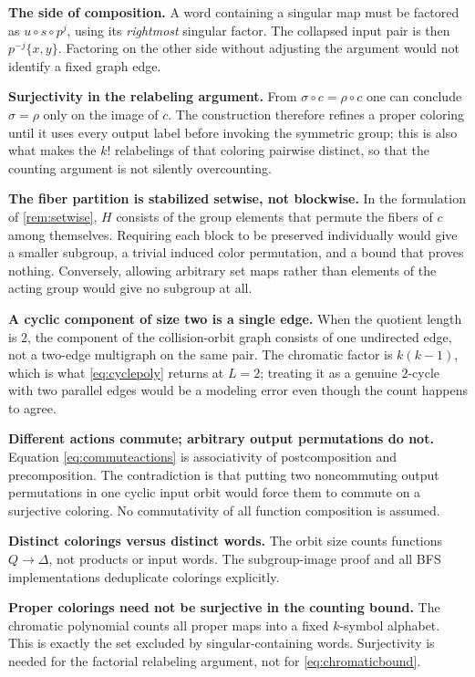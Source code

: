 \documentclass[11pt,a4paper]{article}
\numberwithin{equation}{section}
\theoremstyle{definition}
\theoremstyle{remark}
\newcommand{\D}{\Delta}
\begin{document}
\textbf{The side of composition.} A word containing a singular map must be
factored as $u\circ s\circ p^j$, using its \emph{rightmost} singular factor.
The collapsed input pair is then $p^{-j}\{x,y\}$. Factoring on the other
side without adjusting the argument would not identify a fixed graph edge.

\textbf{Surjectivity in the relabeling argument.} From
$\sigma\circ c=\rho\circ c$ one can conclude $\sigma=\rho$ only on the
image of $c$. The construction therefore refines a proper coloring until it
uses every output label before invoking the symmetric group; this is also
what makes the $k!$ relabelings of that coloring pairwise distinct, so that
the counting argument is not silently overcounting.

\textbf{The fiber partition is stabilized setwise, not blockwise.} In the
formulation of \cref{rem:setwise}, $H$ consists of the group elements that
permute the fibers of $c$ among themselves. Requiring each block to be
preserved individually would give a smaller subgroup, a trivial induced
color permutation, and a bound that proves nothing. Conversely, allowing
arbitrary set maps rather than elements of the acting group would give no
subgroup at all.

\textbf{A cyclic component of size two is a single edge.} When the quotient
length is $2$, the component of the collision-orbit graph consists of one
undirected edge, not a two-edge multigraph on the same pair. The chromatic
factor is $k(k-1)$, which is what \eqref{eq:cyclepoly} returns at $L=2$;
treating it as a genuine $2$-cycle with two parallel edges would be a
modeling error even though the count happens to agree.

\textbf{Different actions commute; arbitrary output permutations do not.}
Equation \eqref{eq:commuteactions} is associativity of postcomposition and
precomposition. The contradiction is that putting two noncommuting output
permutations in one cyclic input orbit would force them to commute on a
surjective coloring. No commutativity of all function composition is
assumed.

\textbf{Distinct colorings versus distinct words.} The orbit size counts
functions $Q\to\D$, not products or input words. The subgroup-image proof
and all BFS implementations deduplicate colorings explicitly.

\textbf{Proper colorings need not be surjective in the counting bound.}
The chromatic polynomial counts all proper maps into a fixed $k$-symbol
alphabet. This is exactly the set excluded by singular-containing words.
Surjectivity is needed for the factorial relabeling argument, not for
\eqref{eq:chromaticbound}.
\end{document}
